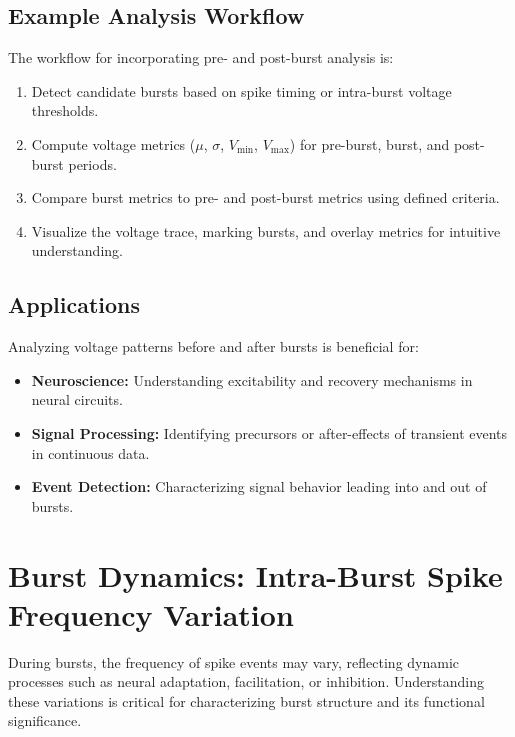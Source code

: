 \documentclass[a4paper,9pt]{extarticle}
\begin{document}
\subsection{Example Analysis Workflow}

The workflow for incorporating pre- and post-burst analysis is:
\begin{enumerate}
    \item Detect candidate bursts based on spike timing or intra-burst voltage thresholds.
    \item Compute voltage metrics ($\mu$, $\sigma$, $V_{\text{min}}$, $V_{\text{max}}$) for pre-burst, burst, and post-burst periods.
    \item Compare burst metrics to pre- and post-burst metrics using defined criteria.
    \item Visualize the voltage trace, marking bursts, and overlay metrics for intuitive understanding.
\end{enumerate}

\subsection{Applications}
Analyzing voltage patterns before and after bursts is beneficial for:
\begin{itemize}
    \item \textbf{Neuroscience:} Understanding excitability and recovery mechanisms in neural circuits.
    \item \textbf{Signal Processing:} Identifying precursors or after-effects of transient events in continuous data.
    \item \textbf{Event Detection:} Characterizing signal behavior leading into and out of bursts.
\end{itemize}

\section{Burst Dynamics: Intra-Burst Spike Frequency Variation}

During bursts, the frequency of spike events may vary, reflecting dynamic processes such as neural adaptation, facilitation, or inhibition. Understanding these variations is critical for characterizing burst structure and its functional significance.
\end{document}
